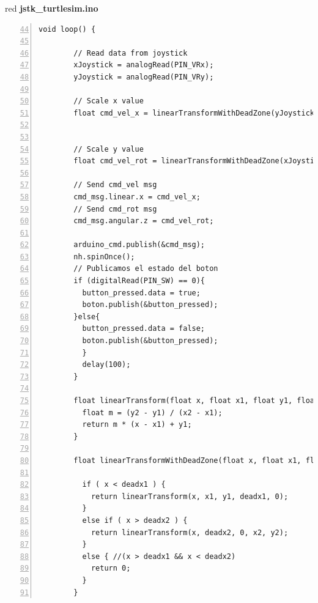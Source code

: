 \documentclass{article}
\begin{document}
\begin{bodyblock}{red}{ \textbf{jstk\_turtlesim.ino}}

  \begin{lstlisting}[language=Arduino,firstnumber=44, mathescape=true, breaklines=true,numbers=left,
    xleftmargin=0.03\textwidth, columns=fullflexible, flexiblecolumns=true, gobble=8]
        void loop() {

        // Read data from joystick
        xJoystick = analogRead(PIN_VRx);
        yJoystick = analogRead(PIN_VRy);

        // Scale x value
        float cmd_vel_x = linearTransformWithDeadZone(yJoystick, 0, -1, 500, 520, 1023, 1);


        // Scale y value
        float cmd_vel_rot = linearTransformWithDeadZone(xJoystick, 0, 3, 500, 520, 1023, -3);

        // Send cmd_vel msg
        cmd_msg.linear.x = cmd_vel_x;
        // Send cmd_rot msg
        cmd_msg.angular.z = cmd_vel_rot;
          
        arduino_cmd.publish(&cmd_msg);
        nh.spinOnce();
        // Publicamos el estado del boton
        if (digitalRead(PIN_SW) == 0){
          button_pressed.data = true;
          boton.publish(&button_pressed);
        }else{
          button_pressed.data = false;
          boton.publish(&button_pressed);   
          }
          delay(100);  
        }

        float linearTransform(float x, float x1, float y1, float x2, float y2) {
          float m = (y2 - y1) / (x2 - x1);
          return m * (x - x1) + y1;  
        }

        float linearTransformWithDeadZone(float x, float x1, float y1, float deadx1, float deadx2, float x2, float y2) {
          
          if ( x < deadx1 ) {
            return linearTransform(x, x1, y1, deadx1, 0);
          }
          else if ( x > deadx2 ) {
            return linearTransform(x, deadx2, 0, x2, y2);
          }
          else { //(x > deadx1 && x < deadx2)
            return 0;
          }
        }
\end{lstlisting}
\end{bodyblock}
\end{document}
